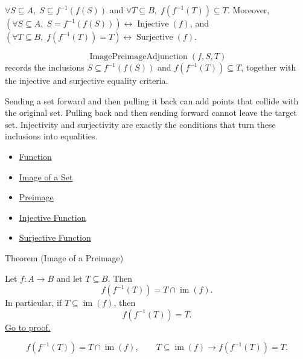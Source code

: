 \begin{remark*}
$\forall S\subseteq A,\; S\subseteq f^{-1}(f(S))$ and
$\forall T\subseteq B,\; f(f^{-1}(T))\subseteq T$. Moreover,
$(\forall S\subseteq A,\; S=f^{-1}(f(S)))\leftrightarrow
\operatorname{Injective}(f)$, and $(\forall T\subseteq B,\;
f(f^{-1}(T))=T)\leftrightarrow \operatorname{Surjective}(f)$.
\end{remark*}

\begin{remark*}
\[
  \operatorname{ImagePreimageAdjunction}(f,S,T)
\] records the inclusions
$S\subseteq f^{-1}(f(S))$ and $f(f^{-1}(T))\subseteq T$, together with the
injective and surjective equality criteria.
\end{remark*}

\begin{remark*}[Interpretation]
Sending a set forward and then pulling it back can add points that collide with
the original set. Pulling back and then sending forward cannot leave the target
set. Injectivity and surjectivity are exactly the conditions that turn these
inclusions into equalities.
\end{remark*}

\begin{dependencies}
\begin{itemize}
  \item \hyperref[def:function]{Function}
  \item \hyperref[def:image-set]{Image of a Set}
  \item \hyperref[def:preimage]{Preimage}
  \item \hyperref[def:injective]{Injective Function}
  \item \hyperref[def:surjective]{Surjective Function}
\end{itemize}
\end{dependencies}

\begin{theorembox}{Theorem (Image of a Preimage)}
\begin{theorem}\label{thm:image-of-preimage}
Let $f:A\to B$ and let $T\subseteq B$. Then
\[
f(f^{-1}(T)) = T\cap \operatorname{im}(f).
\]
In particular, if $T\subseteq \operatorname{im}(f)$, then
\[
f(f^{-1}(T))=T.
\]
\hyperref[prf:image-of-preimage]{Go to proof.}
\end{theorem}
\end{theorembox}

\begin{remark*}
\[
f(f^{-1}(T)) = T\cap \operatorname{im}(f),
\qquad
T\subseteq \operatorname{im}(f)\to f(f^{-1}(T))=T.
\]
\end{remark*}

